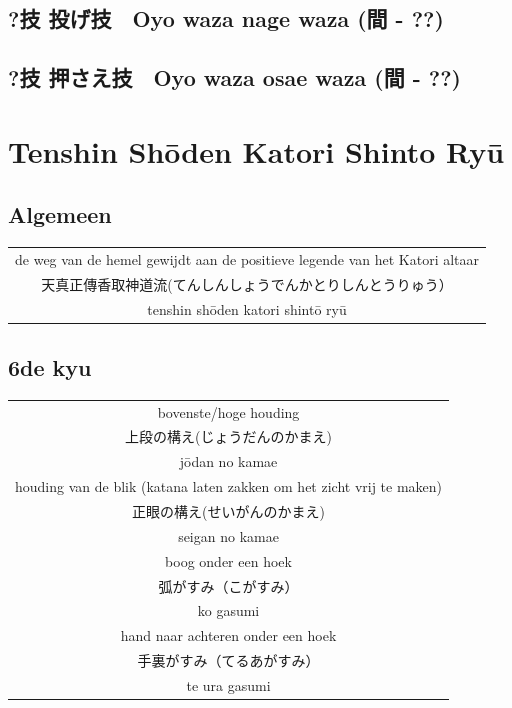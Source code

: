 \documentclass[12pt]{scrartcl}
\begin{document}
\begin{CJK*}{UTF8}{min}
\subsection{?技 投げ技　Oyo waza nage waza (間 - ??)}

\subsection{?技 押さえ技　Oyo waza osae waza (間 - ??)}

\newpage
\section{Tenshin Sh\={o}den Katori Shinto Ry\={u}}
\subsection{Algemeen}
\begin{table}[H]
\begin{center}
\begin{tabular}{c}
de weg van de hemel gewijdt aan de positieve legende van het Katori altaar\\ 
天真正傳香取神道流(てんしんしょうでんかとりしんとうりゅう）\\
tenshin sh\={o}den katori shint\={o} ry\={u}
\end{tabular}
\end{center}
\label{katori}
\end{table}


\subsection{6de kyu}
\begin{table}[H]
\begin{center}
\begin{tabular}{c}
bovenste/hoge houding\\
上段の構え(じょうだんのかまえ)\\
j\={o}dan no kamae\\
\hline
houding van de blik (katana laten zakken om het zicht vrij te maken)\\
正眼の構え(せいがんのかまえ)\\
seigan no kamae\\
\hline
boog onder een hoek\\
弧がすみ（こがすみ）\\
ko gasumi\\
\hline
hand naar achteren onder een hoek\\
手裏がすみ（てるあがすみ）\\
te ura gasumi
\end{tabular}
\end{center}
\label{kyu_1_katori}
\end{table}

\end{CJK*}
\end{document}
